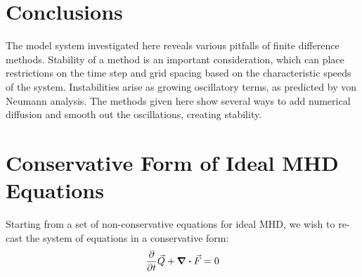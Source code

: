 \documentclass[%
 reprint,
 amsmath,amssymb,
 aps,
]{revtex4-2}
\begin{document}
\section{Conclusions}
The model system investigated here reveals various pitfalls of finite difference methods. Stability of a method is an important consideration, which can place restrictions on the time step and grid spacing based on the characteristic speeds of the system. Instabilities arise as growing oscillatory terms, as predicted by von Neumann analysis. The methods given here show several ways to add numerical diffusion and smooth out the oscillations, creating stability.


\onecolumngrid

\pagebreak

\appendix

\section{Conservative Form of Ideal MHD Equations}

Starting from a set of non-conservative equations for ideal MHD, we wish to re-cast the system of equations in a conservative form:
\begin{equation}
\pdv{}{t} \vec Q + \div \vec F = 0
\end{equation}
\end{document}
